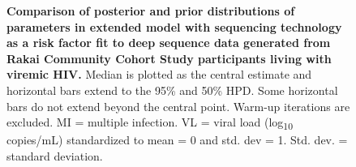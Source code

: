 \documentclass[10pt,letterpaper]{article}
\begin{document}
\begin{figure}[!ht]
\caption{{\bf Comparison of posterior and prior distributions of parameters in extended model with sequencing technology as a risk factor fit to deep sequence data generated from  Rakai Community Cohort Study participants living with viremic HIV.} Median is plotted as the central estimate and horizontal bars extend to the 95\% and 50\% HPD. Some horizontal bars do not extend beyond the central point. Warm-up iterations are excluded. MI = multiple infection. VL = viral load (log\textsubscript{10} copies/mL) standardized to mean = 0 and std. dev = 1. Std. dev. = standard deviation. }
\end{figure}
\end{document}
